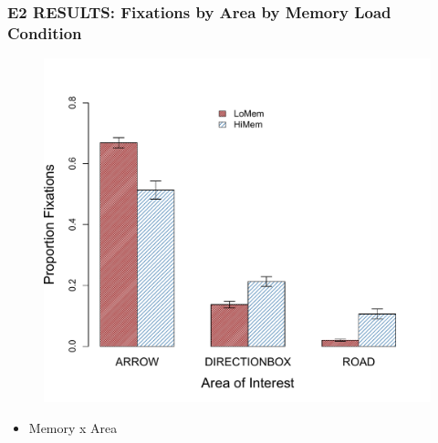 \documentclass{beamer}
\begin{document}
\begin{frame} 
	\frametitle{E2 RESULTS: Fixations by Area by Memory Load Condition}
	\vspace{-1cm}
	\begin{figure}
		\centering
		\includegraphics[width=.6\textwidth]{../zNvBkFigs/Rplot-E2-FixAoI}
	\end{figure}
	\vspace{-1cm}
	{\small{\begin{itemize}
		\item Memory x Area
	\end{itemize}}}

\end{frame}
\end{document}
